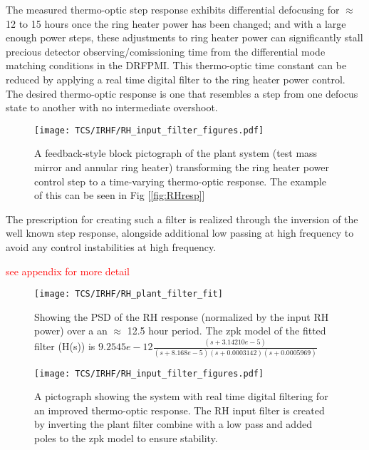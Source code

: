 The measured thermo-optic step response exhibits differential defocusing for $\approx$ 12 to 15 hours once the ring heater power has been changed; and with a large enough power steps, these adjustments to ring heater power can significantly stall precious detector observing/comissioning time from the differential mode matching conditions in the DRFPMI. This thermo-optic time constant can be reduced by applying a real time digital filter to the ring heater power control. The desired thermo-optic response is one that resembles a step from one defocus state to another with no intermediate overshoot. 

\begin{figure}[H]
    \centering
    \texttt{[image: TCS/IRHF/RH\_input\_filter\_figures.pdf]}
    \caption{A feedback-style block pictograph of the plant system (test mass mirror and annular ring heater) transforming the ring heater power control step to a time-varying thermo-optic response. The example of this can be seen in Fig [\ref{fig:RHresp}]}
    \label{fig:justplant}
\end{figure}

The prescription for creating such a filter is realized through the inversion of the well known step response, alongside additional low passing at high frequency to avoid any control instabilities at high frequency.

\textcolor{red}{see appendix for more detail}

\begin{figure}[H]
    \texttt{[image: TCS/IRHF/RH\_plant\_filter\_fit]}
    \caption{Showing the PSD of the RH response (normalized by the input RH power) over a an $\approx$ 12.5 hour period. The zpk model of the fitted filter (H(s)) is $9.2545e-12 \frac{(s+3.14210e-5)}{(s+8.168e-5)(s+0.0003142)(s+0.0005969)}$}
    \label{fig:plant_v_fit}
\end{figure}

\begin{figure}[H]
    \centering
    \texttt{[image: TCS/IRHF/RH\_input\_filter\_figures.pdf]}
    \caption{A pictograph showing the system with real time digital filtering for an improved thermo-optic response. The RH input filter is created by inverting the plant filter combine with a low pass and added poles to the zpk model to ensure stability.}
    \label{fig:rtdf_pictograph}
\end{figure}

